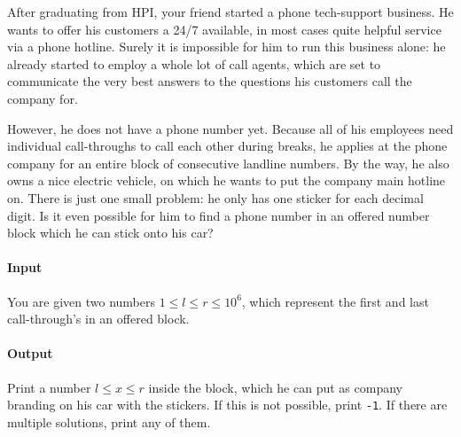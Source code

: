 



\makeheader

After graduating from HPI, your friend started a phone tech-support
business. He wants to offer his customers a 24/7 available, in most cases quite helpful
service via a phone hotline. Surely it is impossible for him to run this
business alone: he already started to employ a whole lot of call agents, which
are set to communicate the very best answers to the questions his customers call the company
for.

However, he does not have a phone number yet. Because all of his employees need
individual call-throughs to call each other during breaks, he applies at the phone company for
an entire block of consecutive landline numbers. By the way, he also owns a nice
electric vehicle, on which he wants to put the company main hotline on. There is
just one small problem: he only has one sticker for each decimal digit. Is it
even possible for him to find a phone number in an offered number block which he can
stick onto his car?

\paragraph*{Input}

You are given two numbers $1\leq l \leq r\leq 10^6$, which represent the first
and last call-through's in an offered block.

\paragraph*{Output}

Print a number $l\leq x\leq r$ inside the block, which he can put as company branding on
his car with the stickers. If this is not possible, print \texttt{-1}. If there are multiple solutions, print any of them.

\begin{samples}
\end{samples}



